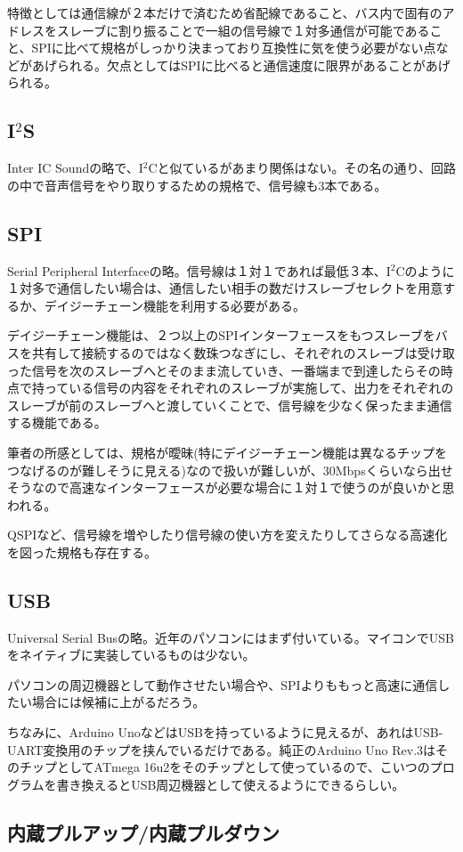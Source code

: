 \documentclass[a4paper,titlepage,here]{ujarticle}
\begin{document}
特徴としては通信線が２本だけで済むため省配線であること、バス内で固有のアドレスをスレーブに割り振ることで一組の信号線で１対多通信が可能であること、SPIに比べて規格がしっかり決まっており互換性に気を使う必要がない点などがあげられる。欠点としてはSPIに比べると通信速度に限界があることがあげられる。
\subsection{I$^2$S}
Inter IC Soundの略で、I$^2$Cと似ているがあまり関係はない。その名の通り、回路の中で音声信号をやり取りするための規格で、信号線も3本である。
\subsection{SPI}
Serial Peripheral Interfaceの略。信号線は１対１であれば最低３本、I$^2$Cのように１対多で通信したい場合は、通信したい相手の数だけスレーブセレクトを用意するか、デイジーチェーン機能を利用する必要がある。

デイジーチェーン機能は、２つ以上のSPIインターフェースをもつスレーブをバスを共有して接続するのではなく数珠つなぎにし、それぞれのスレーブは受け取った信号を次のスレーブへとそのまま流していき、一番端まで到達したらその時点で持っている信号の内容をそれぞれのスレーブが実施して、出力をそれぞれのスレーブが前のスレーブへと渡していくことで、信号線を少なく保ったまま通信する機能である。

筆者の所感としては、規格が曖昧(特にデイジーチェーン機能は異なるチップをつなげるのが難しそうに見える)なので扱いが難しいが、30Mbpsくらいなら出せそうなので高速なインターフェースが必要な場合に１対１で使うのが良いかと思われる。

QSPIなど、信号線を増やしたり信号線の使い方を変えたりしてさらなる高速化を図った規格も存在する。
\subsection{USB}
Universal Serial Busの略。近年のパソコンにはまず付いている。マイコンでUSBをネイティブに実装しているものは少ない。

パソコンの周辺機器として動作させたい場合や、SPIよりももっと高速に通信したい場合には候補に上がるだろう。

ちなみに、Arduino UnoなどはUSBを持っているように見えるが、あれはUSB-UART変換用のチップを挟んでいるだけである。純正のArduino Uno Rev.3はそのチップとしてATmega 16u2をそのチップとして使っているので、こいつのプログラムを書き換えるとUSB周辺機器として使えるようにできるらしい。
\subsection{内蔵プルアップ/内蔵プルダウン}
\end{document}
